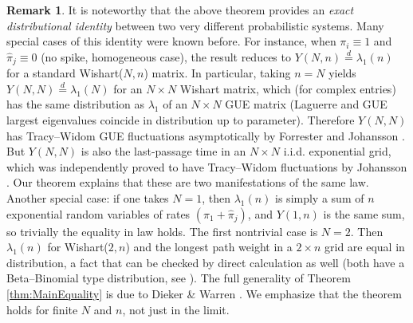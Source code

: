 \documentclass[letterpaper,11pt,oneside,reqno]{article}
\numberwithin{equation}{section}
\theoremstyle{definition}
\newtheorem{remark}[proposition]{Remark}
\begin{document}
\begin{remark}
It is noteworthy that the above theorem provides an \emph{exact distributional identity} between two very different probabilistic systems. Many special cases of this identity were known before. For instance, when $\pi_i\equiv1$ and $\hat\pi_j\equiv0$ (no spike, homogeneous case), the result reduces to $Y(N,n) \stackrel{d}{=} \lambda_1(n)$ for a standard Wishart($N,n$) matrix. In particular, taking $n=N$ yields $Y(N,N) \stackrel{d}{=} \lambda_1(N)$ for an $N\times N$ Wishart matrix, which (for complex entries) has the same distribution as $\lambda_1$ of an $N\times N$ GUE matrix (Laguerre and GUE largest eigenvalues coincide in distribution up to parameter). Therefore $Y(N,N)$ has Tracy--Widom GUE fluctuations asymptotically by Forrester \cite{Forrester1993} and Johansson \cite{Johansson2000}. But $Y(N,N)$ is also the last-passage time in an $N\times N$ i.i.d. exponential grid, which was independently proved to have Tracy--Widom fluctuations by Johansson \cite{Johansson2000}. Our theorem explains that these are two manifestations of the same law. Another special case: if one takes $N=1$, then $\lambda_1(n)$ is simply a sum of $n$ exponential random variables of rates $(\pi_1+\hat\pi_j)$, and $Y(1,n)$ is the same sum, so trivially the equality in law holds. The first nontrivial case is $N=2$. Then $\lambda_1(n)$ for Wishart($2,n$) and the longest path weight in a $2\times n$ grid are equal in distribution, a fact that can be checked by direct calculation as well (both have a Beta--Binomial type distribution, see \cite{Kuan2008}). The full generality of Theorem \ref{thm:MainEquality} is due to Dieker \& Warren \cite{DiekerWarren2009}. We emphasize that the theorem holds for finite $N$ and $n$, not just in the limit.
\end{remark}
\end{document}
